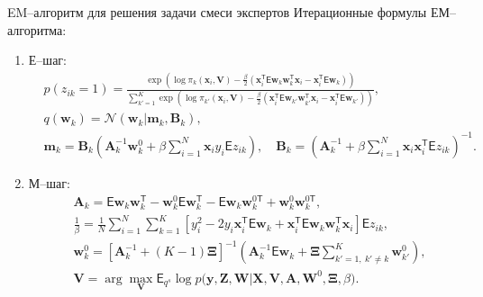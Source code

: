 \documentclass[9pt,pdf,hyperref={unicode}]{beamer}
\begin{document}
\begin{frame}{EM--алгоритм для решения задачи смеси экспертов}
\justifying
Итерационные формулы ЕМ--алгоритма:
	\begin{enumerate}
		\item Е--шаг: 
			\begin{equation*}
				\begin{aligned}
					&p\left(z_{ik} = 1\right) = \frac{\exp\left(\log\pi_{k}\left(\textbf{x}_{i}, \textbf{V}\right) - \frac{\beta}{2}\left(\textbf{x}_{i}^{\mathsf{T}}\mathsf{E}\textbf{w}_{k}\textbf{w}_{k}^{\mathsf{T}}\textbf{x}_{i} - \textbf{x}_{i}^{\mathsf{T}}\mathsf{E}\textbf{w}_{k}\right)\right)}{\sum_{k'=1}^{K}\exp\left(\log\pi_{k'}\left(\textbf{x}_{i}, \textbf{V}\right) - \frac{\beta}{2}\left(\textbf{x}_{i}^{\mathsf{T}}\mathsf{E}\textbf{w}_{k'}\textbf{w}_{k'}^{\mathsf{T}}\textbf{x}_{i} - \textbf{x}_{i}^{\mathsf{T}}\mathsf{E}\textbf{w}_{k'}\right) \right)},\\
					&q(\textbf{w}_k) = \mathcal{N}(\textbf{w}_k|\textbf{m}_k, \textbf{B}_k),\\
					&\mathbf{m}_{k} = \mathbf{B}_{k}\left(\mathbf{A}_{k}^{-1}\mathbf{w}_{k}^{0}+\beta\sum_{i=1}^{N}\mathbf{x}_{i}y_{i}\mathsf{E}z_{ik}\right), \quad
					\mathbf{B}_{k} = \left(\mathbf{A}_{k}^{-1}+\beta\sum_{i=1}^{N}\mathbf{x}_{i}\mathbf{x}_{i}^{\mathsf{T}}\mathsf{E}z_{ik}\right)^{-1} .
				\end{aligned}
			\end{equation*}
		\item М--шаг: 
			\begin{equation*}
				\begin{aligned}
					&\textbf{A}_{k} = \mathsf{E}\textbf{w}_{k}\textbf{w}_{k}^{\mathsf{T}} - \textbf{w}_{k}^{0}\mathsf{E}\textbf{w}_{k}^{\mathsf{T}} - \mathsf{E}\textbf{w}_{k}\textbf{w}_{k}^{0\mathsf{T}} + \textbf{w}_{k}^{0}\textbf{w}_{k}^{0\mathsf{T}}, \\
					 &\frac{1}{\beta}=\frac{1}{N}\sum_{i=1}^{N}\sum_{k=1}^{K}\left[y_{i}^{2}-2y_{i}\textbf{x}_{i}^{\mathsf{T}}\mathsf{E}\textbf{w}_{k} + \textbf{x}_{i}^{\mathsf{T}}\mathsf{E}\textbf{w}_{k}\textbf{w}_{k}^{\mathsf{T}}\textbf{x}_{i}\right]\mathsf{E}z_{ik},\\
					&\textbf{w}_{k}^{0} =\left[\textbf{A}_{k}^{-1}+\left(K-1\right)\bm{\Xi}\right]^{-1}\left(\textbf{A}^{-1}_{k}\mathsf{E}\textbf{w}_{k}+\bm{\Xi}\sum_{k'=1,~k'\not=k}^{K}\textbf{w}_{k'}^{0}\right),\\
					&\textbf{V}= \arg\max_{\textbf{V}} \mathsf{E}_{q^{s}}\log p\bigr(\mathbf{y}, \textbf{Z},\mathbf{W}|\mathbf{X}, \mathbf{V}, \textbf{A}, \textbf{W}^{0}, \bm{\Xi}, \beta\bigr).
				\end{aligned}
			\end{equation*}
	\end{enumerate}
\end{frame}
\end{document}
